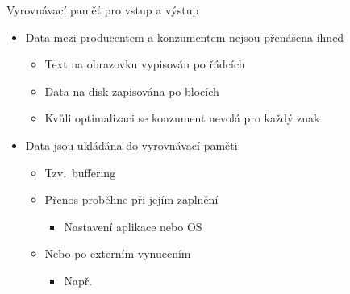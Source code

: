 \begin{frame}{Vyrovnávací paměť pro vstup a výstup}

  \begin{itemize}
    \item Data mezi producentem a konzumentem nejsou přenášena ihned
    \begin{itemize}
      \item Text na obrazovku vypisován po řádcích
      \item Data na disk zapisována po blocích
      \item Kvůli optimalizaci se konzument nevolá pro každý znak
    \end{itemize}

    \pause

    \item Data jsou ukládána do vyrovnávací paměti
    \begin{itemize}
      \item Tzv.\ buffering

      \pause

      \item Přenos proběhne při jejím zaplnění
      \begin{itemize}
	\item Nastavení aplikace nebo OS
      \end{itemize}

      \pause

      \item Nebo po externím vynucením
      \begin{itemize}
	\item Např.\ 
      \end{itemize}
    \end{itemize}

  \end{itemize}

\end{frame}

